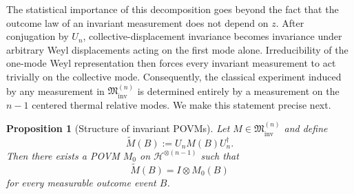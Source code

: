 \documentclass{article}
\newtheorem{prop}[theorem]{Proposition}
\theoremstyle{named}
\theoremstyle{named1}
\newcommand{\cM}{\mathfrak M}
\newcommand{\cH}{\mathcal H}
\theoremstyle{plain}
\theoremstyle{remark}
\begin{document}
The statistical importance of this decomposition goes beyond the fact that
the outcome law of an invariant measurement does not depend on $z$.
After conjugation by $U_n$, collective-displacement invariance becomes
invariance under arbitrary Weyl displacements acting on the first mode
alone. Irreducibility of the one-mode Weyl representation then forces every
invariant measurement to act trivially on the collective mode. Consequently,
the classical experiment induced by any measurement in
$\cM_{\mathrm{inv}}^{(n)}$ is determined entirely by a measurement on the
$n-1$ centered thermal relative modes. We make this statement precise next.

\begin{prop}[Structure of invariant POVMs]
\label{prop:invariant-structure}
Let $M\in\cM_{\mathrm{inv}}^{(n)}$ and define
\[
    \widetilde M(B)
    :=
    U_nM(B)U_n^\dagger.
\]
Then there exists a POVM $M_0$ on $\cH^{\otimes(n-1)}$ such that
\begin{equation}
    \widetilde M(B)
    =
    I\otimes M_0(B)
    \label{eq:invariant-factor-form}
\end{equation}
for every measurable outcome event $B$.
\end{prop}
\end{document}
